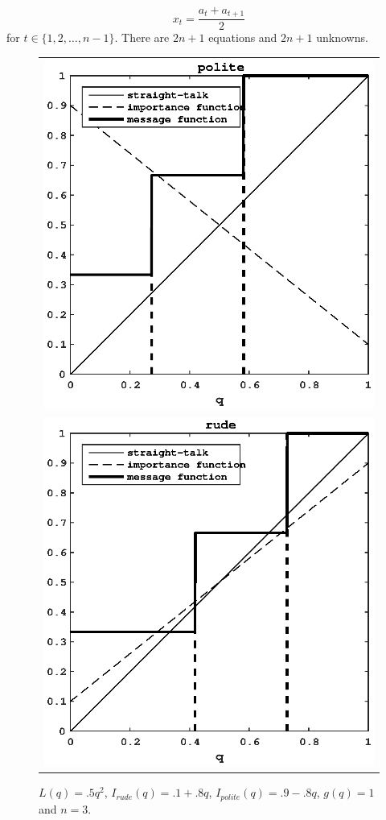 \documentclass[12pt]{article}
\begin{document}
\begin{equation*}
x_{t}=\frac{a_{t}+a_{t+1}}{2}
\end{equation*}
for $t\in\{1,2,\ldots,n-1\}$. There are $2n+1$ equations and $2n+1$ unknowns.
\begin{figure}[H]
\centering
\begin{tabular}{c}
\includegraphics{polite3} \\ 
\includegraphics{rude3}
\end{tabular}
\caption{$L(q)=.5q^2$, $I_{rude}(q)=.1+.8q$, $I_{polite}(q)=.9-.8q$, $g(q)=1$ and $n=3$.}
\end{figure}
\end{document}
